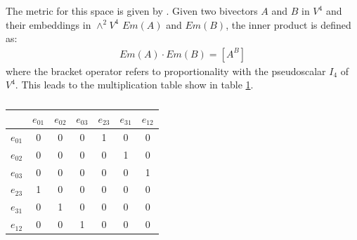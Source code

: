 \documentclass[a4paper, 10pt]{article}
\begin{document}
The metric for this space is given by \cite{hangbo2011}. Given two bivectors $A$
and $B$ in $V^4$ and their embeddings in $\wedge^2 V^4$ $Em(A)$ and $Em(B)$, the
inner product is defined as:
\begin{align*}
  Em(A) \cdot Em(B) = [A ^ B]
\end{align*}
where the bracket operator refers to proportionality with the pseudoscalar $I_4$
of $V^4$. This leads to the multiplication table show in table \ref{table:mult}.
\begin{table}
  \centering
  \begin{tabular}{|c | c c c | c c c|}
    \hline
    & $e_{01}$ & $e_{02}$ & $e_{03}$ & $e_{23}$ & $e_{31}$ & $e_{12}$ \\
    \hline
    $e_{01}$ & 0 & 0 & 0 & 1 & 0 & 0 \\
    $e_{02}$ & 0 & 0 & 0 & 0 & 1 & 0 \\
    $e_{03}$ & 0 & 0 & 0 & 0 & 0 & 1 \\
    \hline
    $e_{23}$ & 1 & 0 & 0 & 0 & 0 & 0 \\
    $e_{31}$ & 0 & 1 & 0 & 0 & 0 & 0 \\
    $e_{12}$ & 0 & 0 & 1 & 0 & 0 & 0 \\
    \hline
  \end{tabular}
  \caption{}
  \label{table:mult}
\end{table}
\end{document}
